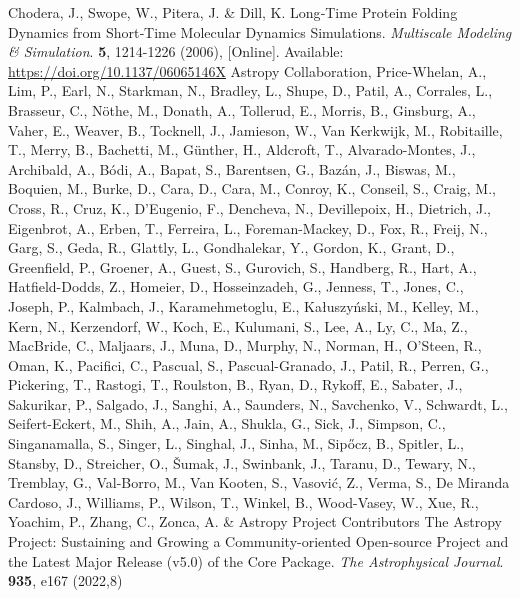 \documentclass[conference]{IEEEtran}
\begin{document}
\begin{thebibliography}{00}
Chodera, J., Swope, W., Pitera, J. \& Dill, K. Long‐Time Protein Folding Dynamics from Short‐Time Molecular Dynamics Simulations. {\em Multiscale Modeling \& Simulation}. \textbf{5}, 1214-1226 (2006), [Online]. Available: \url{https://doi.org/10.1137/06065146X}
Astropy Collaboration, Price-Whelan, A., Lim, P., Earl, N., Starkman, N., Bradley, L., Shupe, D., Patil, A., Corrales, L., Brasseur, C., Nöthe, M., Donath, A., Tollerud, E., Morris, B., Ginsburg, A., Vaher, E., Weaver, B., Tocknell, J., Jamieson, W., Van Kerkwijk, M., Robitaille, T., Merry, B., Bachetti, M., Günther, H., Aldcroft, T., Alvarado-Montes, J., Archibald, A., Bódi, A., Bapat, S., Barentsen, G., Bazán, J., Biswas, M., Boquien, M., Burke, D., Cara, D., Cara, M., Conroy, K., Conseil, S., Craig, M., Cross, R., Cruz, K., D'Eugenio, F., Dencheva, N., Devillepoix, H., Dietrich, J., Eigenbrot, A., Erben, T., Ferreira, L., Foreman-Mackey, D., Fox, R., Freij, N., Garg, S., Geda, R., Glattly, L., Gondhalekar, Y., Gordon, K., Grant, D., Greenfield, P., Groener, A., Guest, S., Gurovich, S., Handberg, R., Hart, A., Hatfield-Dodds, Z., Homeier, D., Hosseinzadeh, G., Jenness, T., Jones, C., Joseph, P., Kalmbach, J., Karamehmetoglu, E., Kałuszyński, M., Kelley, M., Kern, N., Kerzendorf, W., Koch, E., Kulumani, S., Lee, A., Ly, C., Ma, Z., MacBride, C., Maljaars, J., Muna, D., Murphy, N., Norman, H., O'Steen, R., Oman, K., Pacifici, C., Pascual, S., Pascual-Granado, J., Patil, R., Perren, G., Pickering, T., Rastogi, T., Roulston, B., Ryan, D., Rykoff, E., Sabater, J., Sakurikar, P., Salgado, J., Sanghi, A., Saunders, N., Savchenko, V., Schwardt, L., Seifert-Eckert, M., Shih, A., Jain, A., Shukla, G., Sick, J., Simpson, C., Singanamalla, S., Singer, L., Singhal, J., Sinha, M., Sipőcz, B., Spitler, L., Stansby, D., Streicher, O., Šumak, J., Swinbank, J., Taranu, D., Tewary, N., Tremblay, G., Val-Borro, M., Van Kooten, S., Vasović, Z., Verma, S., De Miranda Cardoso, J., Williams, P., Wilson, T., Winkel, B., Wood-Vasey, W., Xue, R., Yoachim, P., Zhang, C., Zonca, A. \& Astropy Project Contributors The Astropy Project: Sustaining and Growing a Community-oriented Open-source Project and the Latest Major Release (v5.0) of the Core Package. {\em The Astrophysical Journal}. \textbf{935}, e167 (2022,8)
\end{thebibliography}
\end{document}
